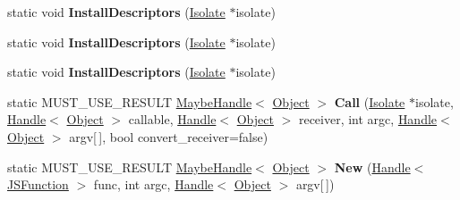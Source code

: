 \begin{DoxyCompactItemize}
\item 
\hypertarget{classv8_1_1internal_1_1_v8___f_i_n_a_l_ace37304bf2b9065231c3ea1ed3b6d6fb}{}static void {\bfseries Install\+Descriptors} (\hyperlink{classv8_1_1internal_1_1_isolate}{Isolate} $\ast$isolate)\label{classv8_1_1internal_1_1_v8___f_i_n_a_l_ace37304bf2b9065231c3ea1ed3b6d6fb}

\item 
\hypertarget{classv8_1_1internal_1_1_v8___f_i_n_a_l_ace37304bf2b9065231c3ea1ed3b6d6fb}{}static void {\bfseries Install\+Descriptors} (\hyperlink{classv8_1_1internal_1_1_isolate}{Isolate} $\ast$isolate)\label{classv8_1_1internal_1_1_v8___f_i_n_a_l_ace37304bf2b9065231c3ea1ed3b6d6fb}

\item 
\hypertarget{classv8_1_1internal_1_1_v8___f_i_n_a_l_ace37304bf2b9065231c3ea1ed3b6d6fb}{}static void {\bfseries Install\+Descriptors} (\hyperlink{classv8_1_1internal_1_1_isolate}{Isolate} $\ast$isolate)\label{classv8_1_1internal_1_1_v8___f_i_n_a_l_ace37304bf2b9065231c3ea1ed3b6d6fb}

\item 
\hypertarget{classv8_1_1internal_1_1_v8___f_i_n_a_l_acb9ac7178875fb62aa494b7d33787c89}{}static M\+U\+S\+T\+\_\+\+U\+S\+E\+\_\+\+R\+E\+S\+U\+L\+T \hyperlink{classv8_1_1internal_1_1_maybe_handle}{Maybe\+Handle}$<$ \hyperlink{classv8_1_1internal_1_1_object}{Object} $>$ {\bfseries Call} (\hyperlink{classv8_1_1internal_1_1_isolate}{Isolate} $\ast$isolate, \hyperlink{classv8_1_1internal_1_1_handle}{Handle}$<$ \hyperlink{classv8_1_1internal_1_1_object}{Object} $>$ callable, \hyperlink{classv8_1_1internal_1_1_handle}{Handle}$<$ \hyperlink{classv8_1_1internal_1_1_object}{Object} $>$ receiver, int argc, \hyperlink{classv8_1_1internal_1_1_handle}{Handle}$<$ \hyperlink{classv8_1_1internal_1_1_object}{Object} $>$ argv\mbox{[}$\,$\mbox{]}, bool convert\+\_\+receiver=false)\label{classv8_1_1internal_1_1_v8___f_i_n_a_l_acb9ac7178875fb62aa494b7d33787c89}

\item 
\hypertarget{classv8_1_1internal_1_1_v8___f_i_n_a_l_a563e690299739c2a4554f09c2cc9b9b2}{}static M\+U\+S\+T\+\_\+\+U\+S\+E\+\_\+\+R\+E\+S\+U\+L\+T \hyperlink{classv8_1_1internal_1_1_maybe_handle}{Maybe\+Handle}$<$ \hyperlink{classv8_1_1internal_1_1_object}{Object} $>$ {\bfseries New} (\hyperlink{classv8_1_1internal_1_1_handle}{Handle}$<$ \hyperlink{classv8_1_1internal_1_1_j_s_function}{J\+S\+Function} $>$ func, int argc, \hyperlink{classv8_1_1internal_1_1_handle}{Handle}$<$ \hyperlink{classv8_1_1internal_1_1_object}{Object} $>$ argv\mbox{[}$\,$\mbox{]})\label{classv8_1_1internal_1_1_v8___f_i_n_a_l_a563e690299739c2a4554f09c2cc9b9b2}


\end{DoxyCompactItemize}
